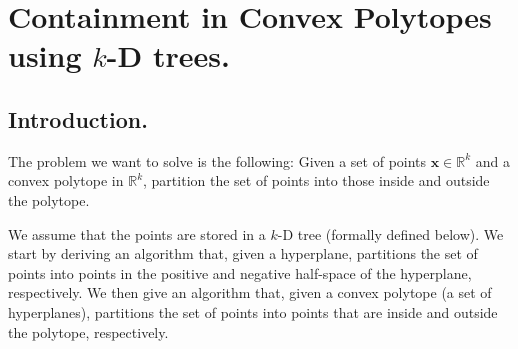 

\newcommand{\Real}{\ensuremath{\mathbb{R}}}

\newcommand{\set}[1]{\left\{#1\right\}}
\renewcommand{\emptyset}{\varnothing}
\newcommand{\union}{\cup}
\newcommand{\intersect}{\cap}
\newcommand{\Union}{\bigcup}
\newcommand{\Intersect}{\bigcap}

\newcommand{\vc}[1]{\ensuremath{\mathbf{#1}}}
\newcommand{\CalT}{\ensuremath{\mathcal{T}}}
\newcommand{\CalP}{\ensuremath{\mathcal{P}}}
\newcommand{\CalC}{\ensuremath{\mathcal{C}}}

\newcommand{\NOT}{\neg}
\newcommand{\AND}{\wedge}
\newcommand{\OR}{\vee}
\newcommand{\IMPL}{\rightarrow}
\newcommand{\EQU}{\leftrightarrow}
\newcommand{\TRUE}{\mathit{true}}
\newcommand{\FALSE}{\mathit{false}}

\newcommand\trees{\ensuremath{\CalT_k}\xspace}
\newcommand\treemax[2][d]{\ensuremath{\operatorname{max}_{#1}\left(#2\right)}\xspace}
\newcommand\treemin[2][d]{\ensuremath{\operatorname{min}_{#1}\left(#2\right)}\xspace}
\newcommand\kdtrees{\ensuremath{\CalT_{kD}}\xspace}
\newcommand\xmin{\ensuremath{\vc{x}^{\operatorname{min}}\xspace}}
\newcommand\xmax{\ensuremath{\vc{x}^{\operatorname{max}}\xspace}}
\newcommand\xcmin[1]{\ensuremath{x^{\operatorname{min}}_{#1}\xspace}}
\newcommand\xcmax[1]{\ensuremath{x^{\operatorname{max}}_{#1}\xspace}}


\newtheorem{definition}{Definition}%
\newtheorem{proposition}{Proposition}%



\section{Containment in Convex Polytopes using $k$-D trees.}


\subsection{Introduction.}
The problem we want to solve is the following:
Given a set of points $\vc{x}\in\Real^k$ and a convex polytope in $\Real^k$, partition the set of points into those inside and outside the polytope.

We assume that the points are stored in a $k$-D tree (formally defined below).
We start by deriving an algorithm that, given a hyperplane, partitions the set of points into points in the positive and negative half-space of the hyperplane, respectively.
We then give an algorithm that, given a convex polytope (a set of hyperplanes), partitions the set of points into points that are inside and outside the polytope, respectively.


